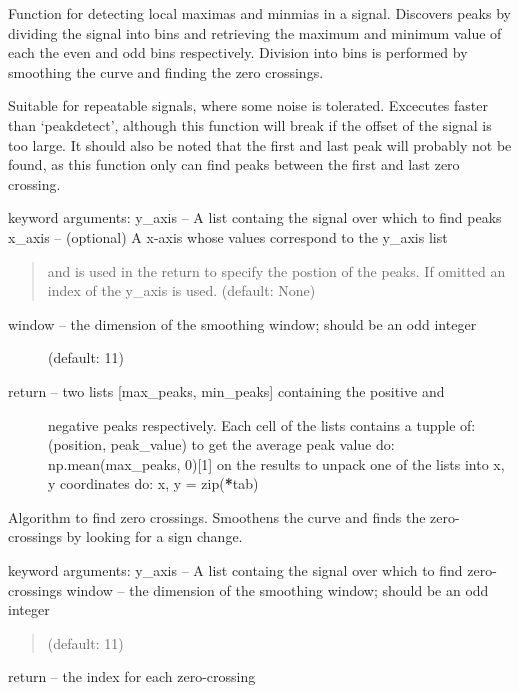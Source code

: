 \documentclass[letterpaper,10pt,english]{sphinxmanual}
\begin{document}
\begin{fulllineitems}
\label{code:peakdet.peakdetect_zero_crossing}
Function for detecting local maximas and minmias in a signal.
Discovers peaks by dividing the signal into bins and retrieving the
maximum and minimum value of each the even and odd bins respectively.
Division into bins is performed by smoothing the curve and finding the
zero crossings.

Suitable for repeatable signals, where some noise is tolerated. Excecutes
faster than `peakdetect', although this function will break if the offset
of the signal is too large. It should also be noted that the first and
last peak will probably not be found, as this function only can find peaks
between the first and last zero crossing.

keyword arguments:
y\_axis -- A list containg the signal over which to find peaks
x\_axis -- (optional) A x-axis whose values correspond to the y\_axis list
\begin{quote}

and is used in the return to specify the postion of the peaks. If
omitted an index of the y\_axis is used. (default: None)
\end{quote}
\begin{description}
\item[{window -- the dimension of the smoothing window; should be an odd integer}] \leavevmode
(default: 11)

\item[{return -- two lists {[}max\_peaks, min\_peaks{]} containing the positive and}] \leavevmode
negative peaks respectively. Each cell of the lists contains a tupple
of: (position, peak\_value) 
to get the average peak value do: np.mean(max\_peaks, 0){[}1{]} on the
results to unpack one of the lists into x, y coordinates do: 
x, y = zip({\color{red}\bfseries{}*}tab)

\end{description}

\end{fulllineitems}


\begin{fulllineitems}
\label{code:peakdet.zero_crossings}
Algorithm to find zero crossings. Smoothens the curve and finds the
zero-crossings by looking for a sign change.

keyword arguments:
y\_axis -- A list containg the signal over which to find zero-crossings
window -- the dimension of the smoothing window; should be an odd integer
\begin{quote}

(default: 11)
\end{quote}

return -- the index for each zero-crossing

\end{fulllineitems}
\end{document}
